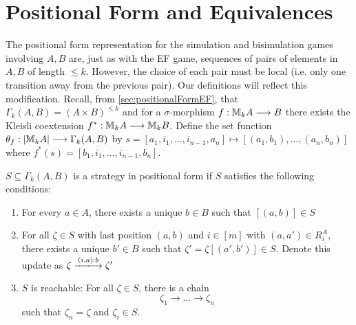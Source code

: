 \section{Positional Form and Equivalences}\label{sec:positionalFormM}
The positional form representation for the simulation and bisimulation games involving $A,B$ are, just as with the EF game, sequences of pairs of elements in $A,B$ of length $\leq k$. However, the choice of each pair must be local (i.e. only one transition away from the previous pair). Our definitions will reflect this modification. Recall, from \ref{sec:positionalFormEF}, that $\Gamma_{k}(A,B) = (A \times B)^{\leq k}$ and for a $\sigma$-morphism $f:{\mathbb{M}_{k}A} \longrightarrow B$ there exists the Kleisli coextension $f^{*}:{\mathbb{M}_{k}A} \longrightarrow {\mathbb{M}_{k}B}$. Define the set function $\theta_{f}:|{\mathbb{M}_{k}A}| \longrightarrow \Gamma_{k}(A,B)$ by $s = [a_{1},i_{1},\dots,i_{n-1},a_{n}] \mapsto [(a_{1},b_{1}),\dots,(a_{n},b_{n})]$ where $f^{*}(s) = [b_{1},i_{1},\dots,i_{n-1},b_{n}]$. 
\begin{defn}
$S \subseteq \Gamma_{k}(A,B)$ is a strategy in positional form if $S$ satisfies the following conditions:
\begin{enumerate}[label=(S\arabic*),ref=S\arabic*,start=0]
\item For every $a \in A$, there exists a unique $b \in B$ such that $[(a,b)] \in S$ \label{eq:S1st}
\item For all $\zeta \in S$ with last position $(a,b)$ and $i \in [m]$ with $(a,a') \in R_{i}^{A}$, there exists a unique $b' \in B$ such that $\zeta' = \zeta[(a',b')] \in S$. Denote this update as $\zeta \xlongrightarrow{(i,a):b} \zeta'$ \label{eq:S2nd}
\item $S$ is reachable: For all $\zeta \in S$, there is a chain \label{eq:S3rd}
$$\zeta_{1} \longrightarrow \dots \longrightarrow \zeta_{n}$$
such that $\zeta_{n} = \zeta$ and $\zeta_{i} \in S$. 
\end{enumerate}
\end{defn}
